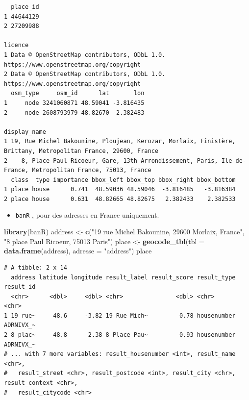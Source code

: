 \documentclass[]{book}
\newenvironment{Shaded}{\begin{snugshade}}{\end{snugshade}}
\newcommand{\KeywordTok}[1]{\textcolor[rgb]{0.13,0.29,0.53}{\textbf{#1}}}
\newcommand{\DataTypeTok}[1]{\textcolor[rgb]{0.13,0.29,0.53}{#1}}
\newcommand{\StringTok}[1]{\textcolor[rgb]{0.31,0.60,0.02}{#1}}
\newcommand{\NormalTok}[1]{#1}
\providecommand{\tightlist}{%
  \setlength{\itemsep}{0pt}\setlength{\parskip}{0pt}}
\begin{document}
\begin{verbatim}
  place_id
1 44644129
2 27209988
                                                                               licence
1 Data © OpenStreetMap contributors, ODbL 1.0. https://www.openstreetmap.org/copyright
2 Data © OpenStreetMap contributors, ODbL 1.0. https://www.openstreetmap.org/copyright
  osm_type     osm_id      lat       lon
1     node 3241060871 48.59041 -3.816435
2     node 2608793979 48.82670  2.382483
                                                                                                   display_name
1 19, Rue Michel Bakounine, Ploujean, Kerozar, Morlaix, Finistère, Brittany, Metropolitan France, 29600, France
2    8, Place Paul Ricoeur, Gare, 13th Arrondissement, Paris, Ile-de-France, Metropolitan France, 75013, France
  class  type importance bbox_left bbox_top bbox_right bbox_bottom
1 place house      0.741  48.59036 48.59046  -3.816485   -3.816384
2 place house      0.631  48.82665 48.82675   2.382433    2.382533
\end{verbatim}

\begin{itemize}
\tightlist
\item
  \texttt{banR} \citep{R-banR}, pour des adresses en France uniquement.
\end{itemize}

\begin{Shaded}
\begin{Highlighting}[]
\KeywordTok{library}\NormalTok{(banR)}
\NormalTok{address <-}\StringTok{ }\KeywordTok{c}\NormalTok{(}\StringTok{"19 rue Michel Bakounine, 29600 Morlaix, France"}\NormalTok{,}
             \StringTok{"8 place Paul Ricoeur, 75013 Paris"}\NormalTok{)}
\NormalTok{place <-}\StringTok{ }\KeywordTok{geocode_tbl}\NormalTok{(}\DataTypeTok{tbl =} \KeywordTok{data.frame}\NormalTok{(address), }\DataTypeTok{adresse =} \StringTok{"address"}\NormalTok{)}
\NormalTok{place}
\end{Highlighting}
\end{Shaded}

\begin{verbatim}
# A tibble: 2 x 14
  address latitude longitude result_label result_score result_type result_id
  <chr>      <dbl>     <dbl> <chr>               <dbl> <chr>       <chr>    
1 19 rue~     48.6     -3.82 19 Rue Mich~         0.78 housenumber ADRNIVX_~
2 8 plac~     48.8      2.38 8 Place Pau~         0.93 housenumber ADRNIVX_~
# ... with 7 more variables: result_housenumber <int>, result_name <chr>,
#   result_street <chr>, result_postcode <int>, result_city <chr>, result_context <chr>,
#   result_citycode <chr>
\end{verbatim}
\end{document}
